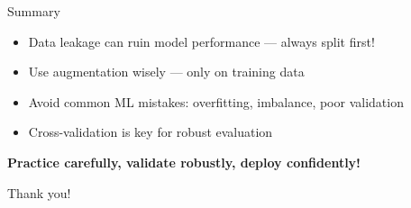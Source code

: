 \documentclass{beamer}
\begin{document}
\begin{frame}{Summary}
\begin{itemize}
    \item Data leakage can ruin model performance — always split first!
    \item Use augmentation wisely — only on training data
    \item Avoid common ML mistakes: overfitting, imbalance, poor validation
    \item Cross-validation is key for robust evaluation
\end{itemize}

\centering
\textbf{Practice carefully, validate robustly, deploy confidently!}
\end{frame}


\begin{frame}[standout]
    Thank you!
\end{frame}
\end{document}
